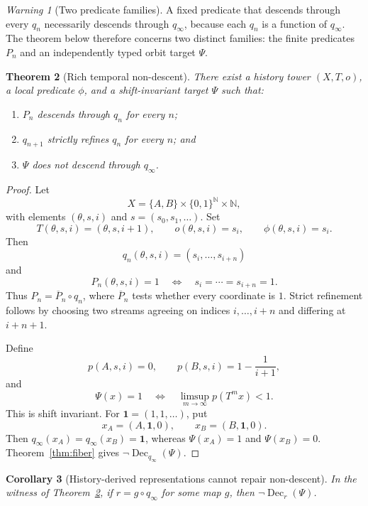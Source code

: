 \documentclass[11pt]{article}
\newcommand{\Bbits}{\ensuremath{\{0,1\}}}
\newcommand{\Xspace}{\ensuremath{X}}
\newcommand{\Endo}{\ensuremath{T}}
\newcommand{\Tail}{\ensuremath{\Psi}}
\newcommand{\Pred}{\ensuremath{\phi}}
\newcommand{\Dec}{\ensuremath{\operatorname{Dec}}}
\theoremstyle{plain}
\newtheorem{theorem}{Theorem}[section]
\newtheorem{corollary}[theorem]{Corollary}
\theoremstyle{definition}
\theoremstyle{remark}
\newtheorem{warning}[theorem]{Warning}
\begin{document}
\begin{warning}[Two predicate families]
A fixed predicate that descends through every $q_n$ necessarily descends through
$q_\infty$, because each $q_n$ is a function of $q_\infty$.  The theorem below
therefore concerns two distinct families: the finite predicates $P_n$ and an
independently typed orbit target $\Tail$.
\end{warning}

\begin{theorem}[Rich temporal non-descent]
\label{thm:rich}
There exist a history tower $(\Xspace,\Endo,o)$, a local predicate $\Pred$, and
a shift-invariant target $\Tail$ such that:
\begin{enumerate}[label=\textnormal{(\roman*)},leftmargin=2.6em]
\item $P_n$ descends through $q_n$ for every $n$;
\item $q_{n+1}$ strictly refines $q_n$ for every $n$; and
\item $\Tail$ does not descend through $q_\infty$.
\end{enumerate}
\end{theorem}

\begin{proof}
Let
\[
\Xspace=\{A,B\}\times\Bbits^{\mathbb N}\times\mathbb N,
\]
with elements $(\theta,s,i)$ and $s=(s_0,s_1,\ldots)$.  Set
\[
\Endo(\theta,s,i)=(\theta,s,i+1),\qquad
 o(\theta,s,i)=s_i,\qquad
\Pred(\theta,s,i)=s_i.
\]
Then
\[
q_n(\theta,s,i)=(s_i,\ldots,s_{i+n})
\]
and
\[
P_n(\theta,s,i)=1\quad\Longleftrightarrow\quad
s_i=\cdots=s_{i+n}=1.
\]
Thus $P_n=\overline P_n\circ q_n$, where $\overline P_n$ tests whether every
coordinate is $1$.  Strict refinement follows by choosing two streams agreeing
on indices $i,\ldots,i+n$ and differing at $i+n+1$.

Define
\[
p(A,s,i)=0,\qquad p(B,s,i)=1-\frac{1}{i+1},
\]
and
\[
\Tail(x)=1\quad\Longleftrightarrow\quad
\limsup_{m\to\infty}p(\Endo^m x)<1.
\]
This is shift invariant.  For $\mathbf 1=(1,1,\ldots)$, put
\[
x_A=(A,\mathbf 1,0),\qquad x_B=(B,\mathbf 1,0).
\]
Then $q_\infty(x_A)=q_\infty(x_B)=\mathbf 1$, whereas
$\Tail(x_A)=1$ and $\Tail(x_B)=0$.  Theorem~\ref{thm:fiber} gives
$\neg\Dec_{q_\infty}(\Tail)$.
\end{proof}

\begin{corollary}[History-derived representations cannot repair non-descent]
\label{cor:derived}
In the witness of Theorem~\ref{thm:rich}, if $r=g\circ q_\infty$ for some map
$g$, then $\neg\Dec_r(\Tail)$.
\end{corollary}
\end{document}
